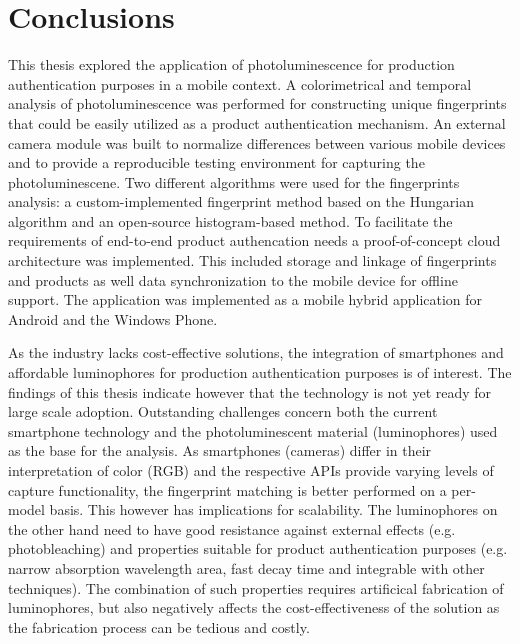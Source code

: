 \documentclass[thesis.tex]{subfiles}
\begin{document}
\chapter{Conclusions}
\label{chapter:conclusions}

This thesis explored the application of photoluminescence for production authentication purposes in a mobile context. A colorimetrical and temporal analysis of photoluminescence was performed for constructing unique fingerprints that could be easily utilized as a product authentication mechanism. An external camera module was built to normalize differences between various mobile devices and to provide a reproducible testing environment for capturing the photoluminescene. Two different algorithms were used for the fingerprints analysis: a custom-implemented fingerprint method based on the Hungarian algorithm and an open-source histogram-based method. To facilitate the requirements of end-to-end product authencation needs a proof-of-concept cloud architecture was implemented. This included storage and linkage of fingerprints and products as well data synchronization to the mobile device for offline support. The application was implemented as a mobile hybrid application for Android and the Windows Phone.

As the industry lacks cost-effective solutions, the integration of smartphones and affordable luminophores for production authentication purposes is of interest. The findings of this thesis indicate however that the technology is not yet ready for large scale adoption. Outstanding challenges concern both the current smartphone technology and the photoluminescent material (luminophores) used as the base for the analysis. As smartphones (cameras) differ in their interpretation of color (RGB) and the respective APIs provide varying levels of capture functionality, the fingerprint matching is better performed on a per-model basis. This however has implications for scalability. The luminophores on the other hand need to have good resistance against external effects (e.g. photobleaching) and properties suitable for product authentication purposes (e.g. narrow absorption wavelength area, fast decay time and integrable with other techniques). The combination of such properties requires artificical fabrication of luminophores, but also negatively affects the cost-effectiveness of the solution as the fabrication process can be tedious and costly.
\end{document}
